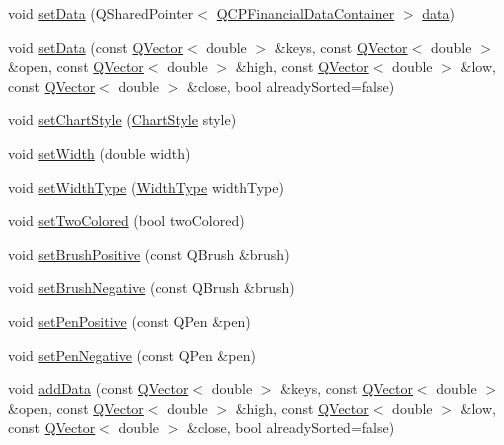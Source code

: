 \begin{DoxyCompactItemize}
\item 
void \hyperlink{class_q_c_p_financial_a72089e75b8a50d18097526c3c79fdb85}{set\+Data} (Q\+Shared\+Pointer$<$ \hyperlink{class_q_c_p_data_container}{Q\+C\+P\+Financial\+Data\+Container} $>$ \hyperlink{class_q_c_p_financial_ad37e283817eff038a05ccba7ae22a630}{data})
\item 
void \hyperlink{class_q_c_p_financial_a12992e669ed19d7bb48dbe601570cc05}{set\+Data} (const \hyperlink{class_q_vector}{Q\+Vector}$<$ double $>$ \&keys, const \hyperlink{class_q_vector}{Q\+Vector}$<$ double $>$ \&open, const \hyperlink{class_q_vector}{Q\+Vector}$<$ double $>$ \&high, const \hyperlink{class_q_vector}{Q\+Vector}$<$ double $>$ \&low, const \hyperlink{class_q_vector}{Q\+Vector}$<$ double $>$ \&close, bool already\+Sorted=false)
\item 
void \hyperlink{class_q_c_p_financial_a5a59175d36279d71596e64d7bb65596f}{set\+Chart\+Style} (\hyperlink{class_q_c_p_financial_a0f800e21ee98d646dfc6f8f89d10ebfb}{Chart\+Style} style)
\item 
void \hyperlink{class_q_c_p_financial_a99633f8bac86a61d534ae5eeb1a3068f}{set\+Width} (double width)
\item 
void \hyperlink{class_q_c_p_financial_a204b7b710352796593a432b723e34089}{set\+Width\+Type} (\hyperlink{class_q_c_p_financial_aef1761dda71a53dc5269685e9e492626}{Width\+Type} width\+Type)
\item 
void \hyperlink{class_q_c_p_financial_a138e44aac160a17a9676652e240c5f08}{set\+Two\+Colored} (bool two\+Colored)
\item 
void \hyperlink{class_q_c_p_financial_a5ebff2b1764efd07cc44942e67821829}{set\+Brush\+Positive} (const Q\+Brush \&brush)
\item 
void \hyperlink{class_q_c_p_financial_a8bbdd87629f9144b3ef51af660c0961a}{set\+Brush\+Negative} (const Q\+Brush \&brush)
\item 
void \hyperlink{class_q_c_p_financial_ac58aa3adc7a35aab0088764b840683e5}{set\+Pen\+Positive} (const Q\+Pen \&pen)
\item 
void \hyperlink{class_q_c_p_financial_afe5c07e94ccea01a75b3a2476993c346}{set\+Pen\+Negative} (const Q\+Pen \&pen)
\item 
void \hyperlink{class_q_c_p_financial_a372ac031e44a7a6c912d203556af96f7}{add\+Data} (const \hyperlink{class_q_vector}{Q\+Vector}$<$ double $>$ \&keys, const \hyperlink{class_q_vector}{Q\+Vector}$<$ double $>$ \&open, const \hyperlink{class_q_vector}{Q\+Vector}$<$ double $>$ \&high, const \hyperlink{class_q_vector}{Q\+Vector}$<$ double $>$ \&low, const \hyperlink{class_q_vector}{Q\+Vector}$<$ double $>$ \&close, bool already\+Sorted=false)

\end{DoxyCompactItemize}
